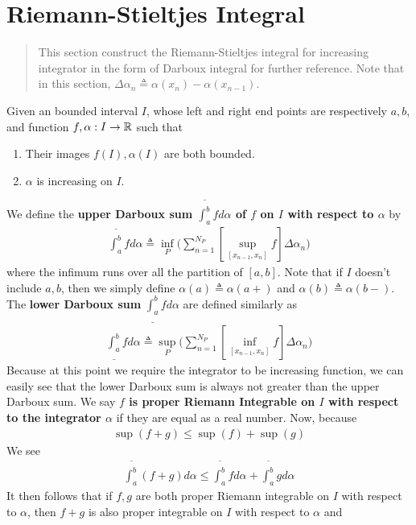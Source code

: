\documentclass{report}
\begin{document}
\section{Riemann-Stieltjes Integral}
\begin{abstract}
This section construct the Riemann-Stieltjes integral for increasing integrator in the form of Darboux integral for further reference. Note that in this section, $\Delta \alpha _n\triangleq \alpha (x_n)-\alpha (x_{n-1})$. 
\end{abstract}
\begin{mdframed}
Given an bounded interval $I$, whose left and right end points are respectively $a,b$, and function  $f,\alpha :I\rightarrow \mathbb{R}$ such that 
\begin{enumerate}[label=(\alph*)]
  \item Their images $f(I),\alpha (I)$ are both bounded. 
  \item $\alpha $ is increasing on $I$. 
\end{enumerate}
We define the \textbf{upper Darboux sum $\overline{\int_a^b}fd\alpha$ of $f$ on $I$ with respect to $\alpha $} by 
\begin{align*}
\overline{\int_a^b}fd\alpha \triangleq  \inf_P \Big(\sum_{n=1}^{N_P} [\sup_{[x_{n-1},x_n]} f] \Delta \alpha _n \Big)
\end{align*}
where the infimum runs over all the partition of $[a,b]$. Note that if $I$ doesn't include $a,b$, then we simply define  $\alpha (a)\triangleq \alpha (a+)$ and $\alpha (b)\triangleq \alpha (b-)$. The \textbf{lower Darboux sum} $\underline{\int_a^b}fd\alpha $ are defined similarly as 
\begin{align*}
\underline{\int_a^b}fd\alpha \triangleq  \sup_P \Big(\sum_{n=1}^{N_P} [\inf_{[x_{n-1},x_n]} f] \Delta \alpha _n \Big)
\end{align*}
Because at this point we require the integrator to be increasing function, we can easily see that the lower Darboux sum is always not greater than the upper Darboux sum. We say \textbf{$f$ is proper Riemann Integrable on $I$ with respect to the integrator $\alpha $} if they are equal as a real number. Now, because 
\begin{align*}
\sup(f+g)\leq \sup (f)+\sup (g) 
\end{align*}
We see 
\begin{align*}
\overline{\int_a^b}(f+g)d\alpha  \leq \overline{\int_a^b}fd\alpha + \overline{\int_a^b}gd\alpha 
\end{align*}
It then follows that if $f,g$ are both proper Riemann integrable on  $I$ with respect to  $\alpha $, then $f+g$ is also proper integrable on $I$ with respect to $\alpha $ and 

\end{mdframed}
\end{document}
